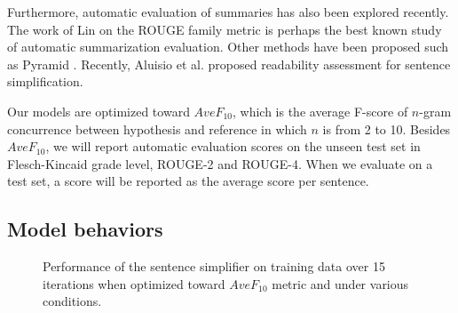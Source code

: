 \documentclass[10pt]{article}
\begin{document}
Furthermore, automatic evaluation of summaries has also been explored recently.
The work of Lin  on the ROUGE family metric is perhaps the best known study of automatic summarization evaluation.
Other methods have been proposed such as Pyramid \cite{Nenkova-et-al:2007}.
Recently, Aluisio et al.  proposed readability assessment for sentence simplification. 

Our models are optimized toward $AveF_{10}$, which is the average F-score of $n$-gram concurrence between hypothesis and reference in which $n$ is from 2 to 10.
Besides $AveF_{10}$, we will report automatic evaluation scores on the unseen test set in Flesch-Kincaid grade level, ROUGE-2 and ROUGE-4. 
When we evaluate on a test set, a score will be reported as the average score per sentence.

\subsection{Model behaviors}

\begin{figure}[ht]%
	\centering
\caption{Performance of the sentence simplifier on training data over 15 iterations when optimized toward $AveF_{10}$ metric and under various conditions.}
\label{fig::fscore}
\end{figure}
\end{document}
